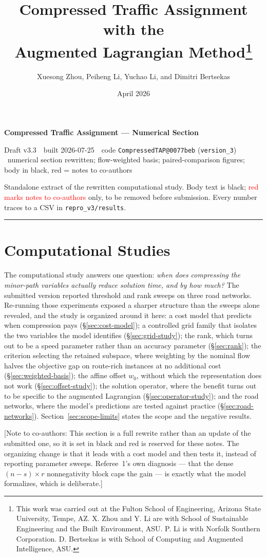 \documentclass[11pt]{article}
\title{Compressed Traffic Assignment with the \\Augmented Lagrangian Method\footnote{
This work was carried out at the Fulton School of Engineering, Arizona State University, Tempe, AZ. X. Zhou and Y. Li are with School of Sustainable Engineering and the Built Environment, ASU. P. Li is with Norfolk Southern Corporation. D. Bertsekas is with School of Computing and Augmented Intelligence, ASU.}}
\author{Xuesong Zhou, Peiheng Li, Yuchao Li, and Dimitri Bertsekas}
\date{April 2026}
\makeatletter
\newcommand{\docver}{v3.3}
\newcommand{\docdate}{2026-07-25}
\newcommand{\doccommit}{0077beb}
\newcommand{\docstamp}{Draft \docver\ \textbullet\ built \docdate\ \textbullet\ code
  \texttt{CompressedTAP@\doccommit} (\texttt{version\_3}) \textbullet\ numerical section
  rewritten; flow-weighted basis; paired-comparison figures; body in black, red = notes to co-authors}
\newcommand{\conote}[1]{{\color{red}\small\textsf{[Note to co-authors: #1]}}}
\makeatother
\begin{document}
{\Large\bfseries Compressed Traffic Assignment --- Numerical Section}\par
\vspace{3pt}
{\small\textsf{\docstamp}}\par
\vspace{3pt}
{\small Standalone extract of the rewritten computational study. Body text is black;
\textcolor{red}{red marks notes to co-authors} only, to be removed before submission.
Every number traces to a CSV in \texttt{repro\_v3/results}.}
\vspace{8pt}\hrule\vspace{8pt}
\section{Computational Studies}
\label{sec:experiments}
\label{sec:experiments}\label{sec:computational}


The computational study answers one question: \emph{when does compressing the minor-path
variables actually reduce solution time, and by how much?} The submitted version reported
threshold and rank sweeps on three road networks. Re-running those experiments exposed a
sharper structure than the sweeps alone revealed, and the study is organized around it here:
a cost model that predicts when compression pays (\S\ref{sec:cost-model}); a controlled grid
family that isolates the two variables the model identifies (\S\ref{sec:grid-study}); the
rank, which turns out to be a speed parameter rather than an accuracy parameter
(\S\ref{sec:rank}); the criterion selecting the retained subspace, where weighting by the
nominal flow halves the objective gap on route-rich instances at no additional cost
(\S\ref{sec:weighted-basis}); the affine offset $w_0$, without which the representation does not work
(\S\ref{sec:offset-study}); the solution operator, where the benefit turns out to be specific
to the augmented Lagrangian (\S\ref{sec:operator-study}); and the road networks, where the
model's predictions are tested against practice (\S\ref{sec:road-networks}).
Section~\ref{sec:scope-limits} states the scope and the negative results.

\conote{This section is a full rewrite rather than an update of the submitted one, so it is
set in black and red is reserved for these notes. The organizing change is that it leads with
a cost model and then tests it, instead of reporting parameter sweeps. Referee~1's own
diagnosis --- that the dense $(n-s)\times r$ nonnegativity block caps the gain --- is exactly
what the model formalizes, which is deliberate.}
\end{document}
